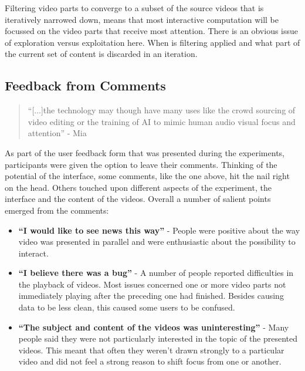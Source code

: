 Filtering video parts to converge to a subset of the source videos that is  iteratively narrowed down, means that most interactive computation will be focussed on the video parts that receive most attention. There is an obvious issue of exploration versus exploitation here. When is filtering applied and what part of the current set of content is discarded in an iteration.


\subsection{Feedback from Comments} %
\label{sub:feedback_from_comments}

\begin{quote}
  ``[...]the technology may though have many uses like the crowd sourcing of video editing or the training of AI to mimic human audio visual focus and attention'' - Mia
\end{quote}

As part of the user feedback form that was presented during the experiments, participants were given the option to leave their comments. Thinking of the potential of the interface, some comments, like the one above, hit the nail right on the head. Others touched upon different aspects of the experiment, the interface and the content of the videos. Overall a number of salient points emerged from the comments:

\begin{itemize}
  \item \textbf{``I would like to see news this way''} - People were positive about the way video was presented in parallel and were enthusiastic about the possibility to interact.
  \item \textbf{``I believe there was a bug''} - A number of people reported difficulties in the playback of videos. Most issues concerned one or more video parts not immediately playing after the preceding one had finished. Besides causing data to be less clean, this caused some users to be confused.
  \item \textbf{``The subject and content of the videos was uninteresting''} - Many people said they were not particularly interested in the topic of the presented videos. This meant that often they weren't drawn strongly to a particular video and did not feel a strong reason to shift focus from one or another.
\end{itemize}

